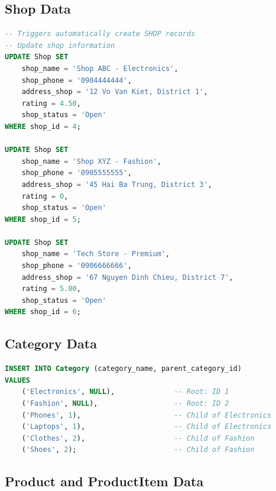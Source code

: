 \subsection{Shop Data}

\begin{lstlisting}[language=SQL, caption=Sample SHOP Insert, label=lst:insert_shop]
-- Triggers automatically create SHOP records
-- Update shop information
UPDATE Shop SET 
    shop_name = 'Shop ABC - Electronics',
    shop_phone = '0904444444',
    address_shop = '12 Vo Van Kiet, District 1',
    rating = 4.50,
    shop_status = 'Open'
WHERE shop_id = 4;

UPDATE Shop SET 
    shop_name = 'Shop XYZ - Fashion',
    shop_phone = '0905555555',
    address_shop = '45 Hai Ba Trung, District 3',
    rating = 0,
    shop_status = 'Open'
WHERE shop_id = 5;

UPDATE Shop SET 
    shop_name = 'Tech Store - Premium',
    shop_phone = '0906666666',
    address_shop = '67 Nguyen Dinh Chieu, District 7',
    rating = 5.00,
    shop_status = 'Open'
WHERE shop_id = 6;
\end{lstlisting}

\subsection{Category Data}

\begin{lstlisting}[language=SQL, caption=Sample CATEGORY Insert, label=lst:insert_category]
INSERT INTO Category (category_name, parent_category_id)
VALUES
    ('Electronics', NULL),              -- Root: ID 1
    ('Fashion', NULL),                  -- Root: ID 2
    ('Phones', 1),                      -- Child of Electronics
    ('Laptops', 1),                     -- Child of Electronics
    ('Clothes', 2),                     -- Child of Fashion
    ('Shoes', 2);                       -- Child of Fashion
\end{lstlisting}

\subsection{Product and ProductItem Data}

